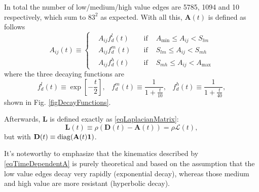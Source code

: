 \documentclass{article}
\begin{document}
                In total the number of low/medium/high value edges are \num{5785}, \num{1094} and \num{10} respectively, which sum to $83^2$ as expected. With all this, $\mathbf A(t)$ is defined as follows
                \begin{equation}
                    \newcommand\vspcR{2pt}
                    A_{ij}(t)\equiv
                    \left\{
                    \begin{alignedat}{2}
                        &A_{ij}f_d^l(t)\quad&\text{if }&A_{\min}\le A_{ij}<S_{lm}\\[\vspcR]
                        &A_{ij}f_d^m(t)\quad&\text{if }&S_{lm}  \le A_{ij}<S_{mh}\\[\vspcR]
                        &A_{ij}f_d^h(t)\quad&\text{if }&S_{mh}  \le A_{ij}<A_{\max}
                    \end{alignedat}
                    \right.
                    \label{eqTimeDependentA}
                \end{equation}
                where the three decaying functions are
                \begin{equation}
                    f_d^l(t)\equiv\exp\left[-\frac t2\right],\;\;\;
                    f_d^m(t)\equiv\frac1{1+\frac t{10}},\;\;\;
                    f_d^h(t)\equiv\frac1{1+\frac t{40}},
                    \label{eqDecayingFunctions}
                \end{equation}
                shown in Fig. \ref{figDecayFunctions}.

                Afterwards, $\mathbf L$ is defined exactly as \eqref{eqLaplacianMatrix}:
                \begin{equation}
                    \mathbf L(t)\equiv\rho(\mathbf D(t)-\mathbf A(t))=\rho\boldsymbol{\mathcal L}(t),
                    \label{eqDynamicLaplacianMatrix}
                \end{equation}
                but with $\mathbf D(t)\equiv\operatorname{diag}(\mathbf A(t)\boldsymbol1)$.

                It's noteworthy to emphasize that the kinematics described by \eqref{eqTimeDependentA} is purely theoretical and based on the assumption that the low value edges decay very rapidly (exponential decay), whereas those medium and high value are more resistant (hyperbolic decay).
\end{document}
